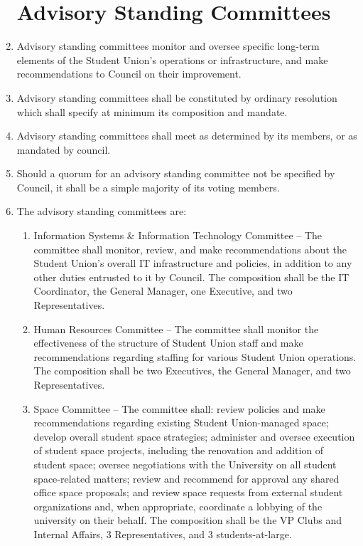 \documentclass[oneside]{book}
\begin{document}
\begin{enumerate}
\section{\label{Advisory_Standing_Committees}Advisory Standing Committees}

\item Advisory standing committees monitor and oversee specific long-term elements of the Student Union's operations or infrastructure, and make recommendations to Council on their improvement.
\item Advisory standing committees shall be constituted by ordinary resolution which shall specify at minimum its composition and mandate.
\item Advisory standing committees shall meet as determined by its members, or as mandated by council.
\item Should a quorum for an advisory standing committee not be specified by Council, it shall be a simple majority of its voting members. 
\item The advisory standing committees are:
\begin{enumerate}
\item Information Systems \& Information Technology Committee -- The committee shall monitor, review, and make recommendations about the Student Union's overall IT infrastructure and policies, in addition to any other duties entrusted to it by Council. The composition shall be the IT Coordinator, the General Manager, one Executive, and two Representatives.
\item Human Resources Committee -- The committee shall monitor the effectiveness of the structure of Student Union staff and make recommendations regarding staffing for various Student Union operations. The composition shall be two Executives, the General Manager, and two Representatives.
\item Space Committee -- The committee shall: review policies and make recommendations regarding existing Student Union-managed space; develop overall student space strategies; administer and oversee execution of student space projects, including the renovation and addition of student space; oversee negotiations with the University on all student space-related matters; review and recommend for approval any shared office space proposals; and review space requests from external student organizations and, when appropriate, coordinate a lobbying of the university on their behalf. The composition shall be the VP Clubs and Internal Affairs, 3 Representatives, and 3 students-at-large. 
\end{enumerate}


\end{enumerate}
\end{document}

